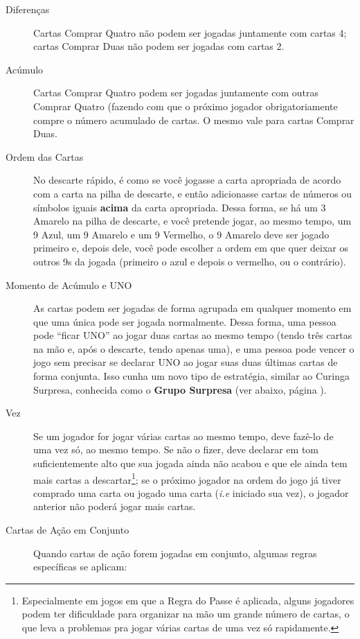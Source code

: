 \begin{description}
\item[Diferenças]{Cartas Comprar Quatro não podem ser jogadas juntamente com cartas 4; cartas Comprar Duas não podem ser jogadas com cartas 2.}
\item[Acúmulo]{Cartas Comprar Quatro podem ser jogadas juntamente com outras Comprar Quatro (fazendo com que o próximo jogador obrigatoriamente compre o número acumulado de cartas. O mesmo vale para cartas Comprar Duas.}
\item[Ordem das Cartas]{No descarte rápido, é como se você jogasse a carta apropriada de acordo com a carta na pilha de descarte, e então adicionasse cartas de números ou símbolos iguais \textbf{acima} da carta apropriada. Dessa forma, se há um 3 Amarelo na pilha de descarte, e você pretende jogar, ao mesmo tempo, um 9 Azul, um 9 Amarelo e um 9 Vermelho, o 9 Amarelo deve ser jogado primeiro e, depois dele, você pode escolher a ordem em que quer deixar os outros 9s da jogada (primeiro o azul e depois o vermelho, ou o contrário).}
\item[Momento de Acúmulo e UNO]{As cartas podem ser jogadas de forma agrupada em qualquer momento em que uma única pode ser jogada normalmente. Dessa forma, uma pessoa pode ``ficar UNO'' ao jogar duas cartas ao mesmo tempo (tendo três cartas na mão e, após o descarte, tendo apenas uma), e uma pessoa pode vencer o jogo sem precisar se declarar UNO ao jogar suas duas últimas cartas de forma conjunta. Isso cunha um novo tipo de estratégia, similar ao Curinga Surpresa, conhecida como o \textbf{Grupo Surpresa} (ver abaixo, página \pageref{gruposurpresa}).}
\item[Vez]{Se um jogador for jogar várias cartas ao mesmo tempo, deve fazê-lo de uma vez só, ao mesmo tempo. Se não o fizer, deve declarar em tom suficientemente alto que sua jogada ainda não acabou e que ele ainda tem mais cartas a descartar\footnote{Especialmente em jogos em que a Regra do Passe é aplicada, alguns jogadores podem ter dificuldade para organizar na mão um grande número de cartas, o que leva a problemas pra jogar várias cartas de uma vez só rapidamente.}; se o próximo jogador na ordem do jogo já tiver comprado uma carta ou jogado uma carta (\emph{i.e} iniciado sua vez), o jogador anterior não poderá jogar mais cartas.}
\item[Cartas de Ação em Conjunto]{Quando cartas de ação forem jogadas em conjunto, algumas regras específicas se aplicam:
\begin{description}

\end{description}}
\end{description}
